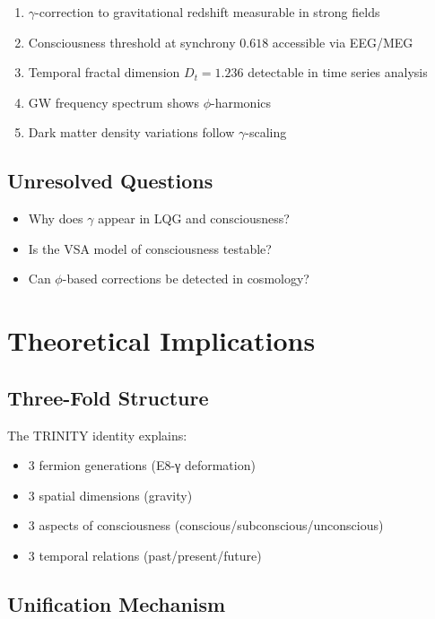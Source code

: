 \documentclass[12pt,a4paper]{article}
\begin{document}
\begin{enumerate}
\item $\gamma$-correction to gravitational redshift measurable in strong fields
\item Consciousness threshold at synchrony $0.618$ accessible via EEG/MEG
\item Temporal fractal dimension $D_t = 1.236$ detectable in time series analysis
\item GW frequency spectrum shows $\phi$-harmonics
\item Dark matter density variations follow $\gamma$-scaling
\end{enumerate}

\subsection{Unresolved Questions}

\begin{itemize}
\item Why does $\gamma$ appear in LQG and consciousness?
\item Is the VSA model of consciousness testable?
\item Can $\phi$-based corrections be detected in cosmology?
\end{itemize}

\section{Theoretical Implications}

\subsection{Three-Fold Structure}

The TRINITY identity explains:
\begin{itemize}
\item 3 fermion generations (E8-γ deformation)
\item 3 spatial dimensions (gravity)
\item 3 aspects of consciousness (conscious/subconscious/unconscious)
\item 3 temporal relations (past/present/future)
\end{itemize}

\subsection{Unification Mechanism}
\end{document}
